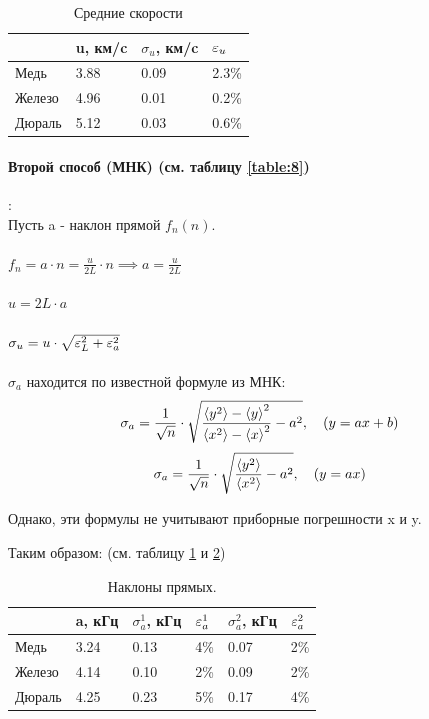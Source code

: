 \documentclass[a4paper,12pt]{article}
\numberwithin{equation}{section}
\begin{document}
\begin{enumerate}
\begin{table} [H] \center
\begin{tabular}{l|lll}
&u, км/c&$\sigma_u$, км/c&$\varepsilon_u$\\
\hline
Медь&3.88&0.09&2.3\%\\
Железо&4.96&0.01&0.2\%\\
Дюраль&5.12&0.03&0.6\%\\
\end{tabular}
\caption{Средние скорости }
\label{table:6}
\end{table}

\paragraph{Второй способ (МНК) (см. таблицу \ref{table:8})}: \\

  Пусть a - наклон прямой $f_n(n)$. \\\\
$f_n = a \cdot n = \frac{u}{2L} \cdot n \implies a = \frac{u}{2L}$ \\\\
$u = 2L \cdot a$ \\\\
$\sigma_u = u \cdot \sqrt{\varepsilon_L^2 + \varepsilon_a^2}$ \\\\
$\sigma_a$ находится по известной формуле из МНК:
\begin{equation}
  \sigma_a = \frac{1}{\sqrt{n}} \cdot 
  \sqrt{\frac{\left< y^2 \right> - \left< y \right>^2}{\left< x^2 \right> - \left< x \right>^2} - a^2}
  ,\quad (y = ax + b)
  \label{eq:slope error(1)}
\end{equation}
\begin{equation}
  \sigma_a = \frac{1}{\sqrt{n}} \cdot 
  \sqrt{\frac{\left< y^2 \right>}{\left< x^2 \right>} - a^2}
  ,\quad (y = ax)
  \label{eq:slope error(2)}
\end{equation}

Однако, эти формулы не учитывают приборные погрешности x и y.

\begin{center} Таким образом: (см. таблицу \ref{table:6} и \ref{table:7}) \end{center}

\begin{table} [H] \center
\begin{tabular}{l|lll|ll}
&a, кГц&$\sigma^1_a$, кГц&$\varepsilon^1_a$&$\sigma^2_a$, кГц&$\varepsilon^2_a$\\
\hline
Медь&3.24&0.13&4\%&0.07&2\%\\
Железо&4.14&0.10&2\%&0.09&2\%\\
Дюраль&4.25&0.23&5\%&0.17&4\%\\
\end{tabular}
\caption{Наклоны прямых.}
\label{table:7}
\end{table}


\end{enumerate}
\end{document}
